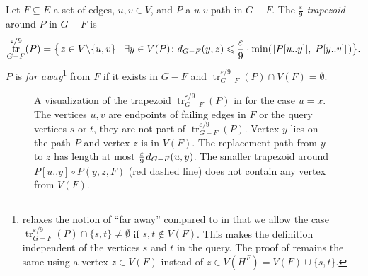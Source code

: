 \documentclass{theoretics}
\DeclareMathOperator{\tr}{tr}
\newcommand*{\length}[1]{|#1|}
\newcommand*{\nwspace}{\hspace*{.1em}}
\renewcommand{\le}{\leqslant}
\newcommand{\eps}{\varepsilon}
\begin{document}
\begin{definition}[$\frac{\eps}{9}$-trapezoid]
\label{def:trapezoid}
  Let $F \subseteq E$ a set of edges, $u,v \in V$,
  and $P$ a $u$-$v$-path in $G-F$.
  The $\frac{\eps}{9}$\emph{-trapezoid} around $P$ in $G-F$ is
  \begin{equation*}
    \tr^{\eps/9}_{G-F}(P) = \big\lbrace\nwspace z \in V{\setminus}\{u,v\} \mid
      \exists y \in V(P) \colon d_{G-F}(y,z)
      \le \frac{\eps}{9}
        \cdot \min(\nwspace \length{P[u..y]}, \length{P[y..v]} \nwspace) \big\rbrace. 
  \end{equation*}
  \noindent
  $P$ is \emph{far away}\footnote{%
       relaxes the notion of ``far away'' compared to \cite{ChCoFiKa17}
      in that we allow the case
      $\tr^{\eps/9}_{G-F}(P) \cap \{s,t\} \neq \emptyset$
      if $s,t \notin V(F)$.
      This makes the definition independent of the vertices $s$ and $t$ in the query.
      The proof of  remains the same
      using a vertex $z \in V(F)$ instead of $z \in V(H^F) = V(F) \cup \{s,t\}$.
  }
  from $F$ if it exists in $G-F$
  and $\tr^{\eps/9}_{G-F}(P) \cap V(F) = \emptyset$.
\end{definition}


\begin{figure}
\centering
{}
\caption{ A visualization of the trapezoid $\tr^{\eps/9}_{G-F}(P)$ 
	in  for the case $u=x$.
	The vertices $u,v$ are endpoints of failing edges in $F$ or the query vertices $s$ or $t$,
	they are not part of $\tr^{\eps/9}_{G-F}(P)$.
	Vertex $y$ lies on the path $P$ and vertex $z$ is in $V(F)$.
	The replacement path from $y$ to $z$ has length 
	at most $\frac{\varepsilon}{9} \nwspace d_{G-F}(u,y)$.
	The smaller trapezoid around $P[u..y] \circ P(y,z,F)$ (red dashed line) 
	does not contain any vertex from $V(F)$.}
\label{fig:trapezoid}
\end{figure}
\end{document}
